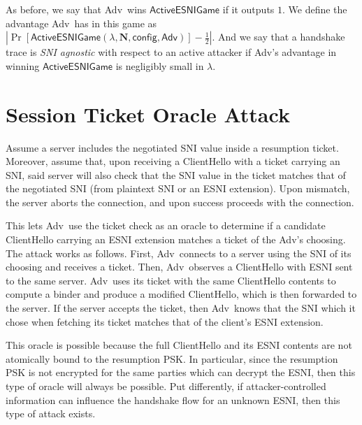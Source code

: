 \documentclass{article}
\newcommand{\adv}{{\sf Adv}}
\newcommand{\madv}{\mathsf{Adv}}
\begin{document}

As before, we say that \adv\ wins $\mathsf{ActiveESNIGame}$ if it outputs $1$. 
We define the advantage \adv\ has in this game as
$|\Pr[\mathsf{ActiveESNIGame}(\lambda, \mathbf{N}, \mathsf{config}, \madv)] - \frac{1}{2}|$. And we say that a handshake trace
is \emph{SNI agnostic} with respect to an active attacker if \adv's advantage in winning $\mathsf{ActiveESNIGame}$ is negligibly 
small in $\lambda$.

\section{Session Ticket Oracle Attack}

Assume a server includes the negotiated SNI value inside
a resumption ticket. Moreover, assume that, upon receiving a ClientHello with a ticket
carrying an SNI, said server will also check that the SNI value in the ticket matches 
that of the negotiated SNI (from plaintext SNI or an ESNI extension). Upon mismatch, the
server aborts the connection, and upon success proceeds with the connection. 

This lets \adv\ use the ticket check as an oracle to determine if a candidate ClientHello
carrying an ESNI extension matches a ticket of the \adv's choosing. The attack works as follows.
First, \adv\ connects to a server using the SNI of its choosing and receives a ticket. Then,
\adv\ observes a ClientHello with ESNI sent to the same server. \adv\ uses its ticket with 
the same ClientHello contents to compute a binder and produce a modified ClientHello, which
is then forwarded to the server. If the server accepts the ticket, then \adv\ knows that the
SNI which it chose when fetching its ticket matches that of the client's ESNI extension. 

This oracle is possible because the full ClientHello and its ESNI contents are not atomically
bound to the resumption PSK. In particular, since the resumption PSK is not encrypted for the
same parties which can decrypt the ESNI, then this type of oracle will always be possible. 
Put differently, if attacker-controlled information can influence the handshake flow for an 
unknown ESNI, then this type of attack exists.

\end{document}
